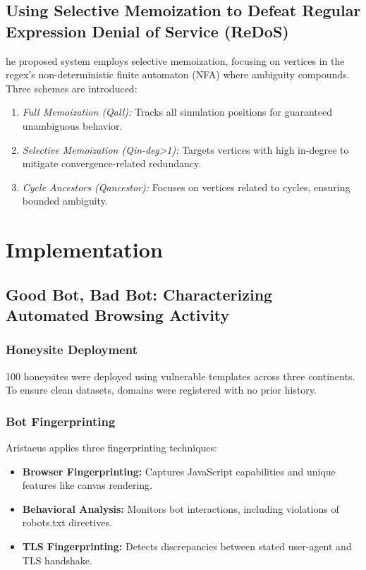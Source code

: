 \documentclass[conference]{IEEEtran}
\begin{document}
\subsection{\textbf{Using Selective Memoization to Defeat Regular Expression Denial of Service (ReDoS)}}
he proposed system employs selective memoization, focusing on vertices in the regex's non-deterministic finite automaton (NFA) where ambiguity compounds. Three schemes are introduced:
\begin{enumerate}
    \item \textit{Full Memoization (Qall):} Tracks all simulation positions for guaranteed unambiguous behavior.
    \item \textit{Selective Memoization (Qin-deg>1):} Targets vertices with high in-degree to mitigate convergence-related redundancy.
    \item \textit{Cycle Ancestors (Qancestor):} Focuses on vertices related to cycles, ensuring bounded ambiguity.
\end{enumerate}

\section{Implementation}
\subsection{\textbf{Good Bot, Bad Bot: Characterizing Automated Browsing Activity}}

\subsubsection{Honeysite Deployment}
100 honeysites were deployed using vulnerable templates across three continents. To ensure clean datasets, domains were registered with no prior history.
\subsubsection{Bot Fingerprinting}
Aristaeus applies three fingerprinting techniques:
\begin{itemize}
    \item \textbf{Browser Fingerprinting: } 
Captures JavaScript capabilities and unique features like canvas rendering.
    \item \textbf{Behavioral Analysis: } 
Monitors bot interactions, including violations of robots.txt directives.
    \item \textbf{TLS Fingerprinting:}
Detects discrepancies between stated user-agent and TLS handshake.
\end{itemize}
\end{document}
